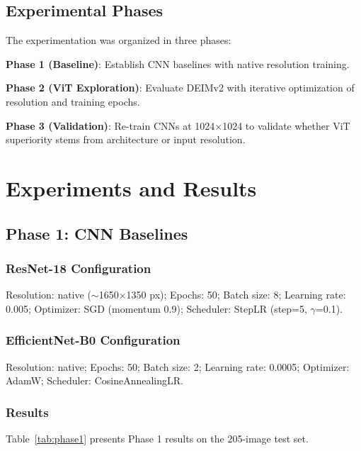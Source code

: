 \documentclass[journal,twoside,web]{ieeecolor}
\begin{document}
\subsection{Experimental Phases}

The experimentation was organized in three phases:

\textbf{Phase 1 (Baseline)}: Establish CNN baselines with native resolution training.

\textbf{Phase 2 (ViT Exploration)}: Evaluate DEIMv2 with iterative optimization of resolution and training epochs.

\textbf{Phase 3 (Validation)}: Re-train CNNs at 1024$\times$1024 to validate whether ViT superiority stems from architecture or input resolution.

\section{Experiments and Results}
\label{sec:experiments}

\subsection{Phase 1: CNN Baselines}

\subsubsection{ResNet-18 Configuration}
Resolution: native ($\sim$1650$\times$1350 px); Epochs: 50; Batch size: 8; Learning rate: 0.005; Optimizer: SGD (momentum 0.9); Scheduler: StepLR (step=5, $\gamma$=0.1).

\subsubsection{EfficientNet-B0 Configuration}
Resolution: native; Epochs: 50; Batch size: 2; Learning rate: 0.0005; Optimizer: AdamW; Scheduler: CosineAnnealingLR.

\subsubsection{Results}

Table~\ref{tab:phase1} presents Phase 1 results on the 205-image test set.
\end{document}

